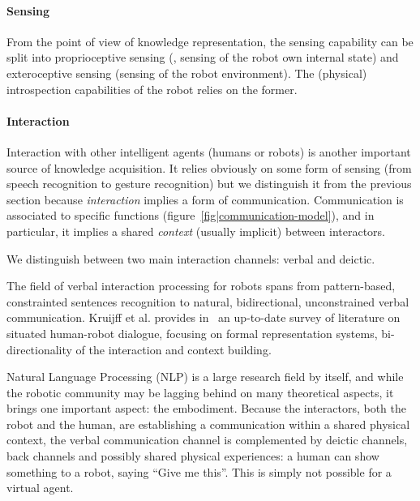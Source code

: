 \paragraph{Sensing}

From the point of view of knowledge representation, the sensing capability can
be split into proprioceptive sensing (\ie, sensing of the robot own internal
state) and exteroceptive sensing (sensing of the robot environment). The
(physical) introspection capabilities of the robot relies on the former.


\paragraph{Interaction}

Interaction with other intelligent agents (humans or robots) is another
important source of knowledge acquisition. It relies obviously on some form of
sensing (from speech recognition to gesture recognition) but we distinguish it
from the previous section because \emph{interaction} implies a form of
communication. Communication is associated to specific functions
(figure~\ref{fig|communication-model}), and in particular, it implies a shared
\emph{context} (usually implicit) between interactors.


We distinguish between two main interaction channels: verbal and deictic.

\begin{scriptsize}
\begin{center}
\end{center}
\end{scriptsize}

\label{sect|nlp}

The field of verbal interaction processing for robots spans from pattern-based,
constrainted sentences recognition to natural, bidirectional, unconstrained
verbal communication. Kruijff et al. provides in~\cite{Kruijff2010} an
up-to-date survey of literature on situated human-robot dialogue, focusing on
formal representation systems, bi-directionality of the interaction and context
building.

Natural Language Processing (NLP) is a large research field by itself, and
while the robotic community may be lagging behind on many theoretical aspects,
it brings one important aspect: the embodiment. Because the interactors, both
the robot and the human, are establishing a communication within a shared
physical context, the verbal communication channel is complemented by deictic
channels, back channels and possibly shared physical experiences: a human can
show something to a robot, saying ``Give me this''. This is simply not possible
for a virtual agent.

